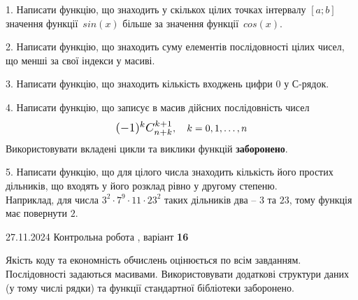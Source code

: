 \documentclass[12pt, ukrainian]{article}
\begin{document}
{{{{{{{{{{{{{{{\begin {large}
1. Написати функцію, що знаходить у скількох цілих точках інтервалу $[a; b]$ значення функції~$sin(x)$ більше за значення функції~$cos(x)$.

\vspace{2mm}


2. Написати функцію, що знаходить суму елементів послідовності цілих чисел, що менші за свої індекси у масиві.

\vspace{2mm}


3. Написати функцію, що знаходить кількість входжень цифри 0 у С-рядок.

\vspace{2mm}


4. 
Написати функцію, що записує в масив дійсних послідовність чисел
$$\scalebox{1.2}{$(-1)^{k}C_{n+k}^{k+1}$}, \quad k=0,1,\ldots,n$$
Використовувати вкладені цикли та виклики функцій \textbf{заборонено}.

\vspace{2mm}


5. Написати функцію, що для цілого числа знаходить кількість його простих дільників, що входять у його розклад рівно у другому степеню. \\ Наприклад, для числа $3^2{\cdot}7^9{\cdot}11{\cdot}23^{2}$ таких дільників два – $3$ та $23$, тому функція має повернути $2$.

\vspace{2mm}

\end{large}
\vspace{35mm}


{{27.11.2024 Контрольна робота , варіант  \No \textbf { 16 }\par}}


{
Якість коду та економність обчислень оцінюється по всім завданням. Послідовності задаються масивами. Використовувати додаткові структури даних (у тому числі рядки) та функції стандартної бібліотеки заборонено.

}}}}}}}}}}}}}}}}
\end{document}
